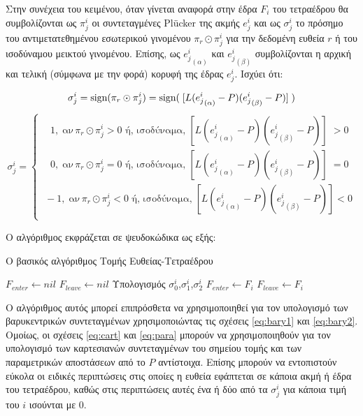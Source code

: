 Στην συνέχεια του κειμένου, όταν γίνεται αναφορά στην έδρα $F_i$ του τετραέδρου θα συμβολίζονται ως $\pi^i_j$ οι συντεταγμένες Plücker της ακμής $e^i_j$  και ως $\sigma^i_j$ το πρόσημο του αντιμετατεθημένου εσωτερικού γινομένου $\pi_r \odot \pi^i_j$ για την δεδομένη ευθεία $r$ ή του ισοδύναμου μεικτού γινομένου. Επίσης, ως ${e^i_j}_{(\alpha)}$ και ${e^i_j}_{(\beta)}$ συμβολίζονται η αρχική και τελική (σύμφωνα με την φορά) κορυφή της έδρας $e^i_j$. Ισχύει ότι:

\begin{equation}
\sigma^i_j =\text{sign}(\pi_r \odot \pi^i_j) = \text{sign}(\;[L({e^i_j}_{(\alpha)}-P)({e^i_j}_{(\beta)}-P)]\;)\\ 
\label{eq:sigmatostp} 
\end{equation}
\begin{equation}
\sigma^i_j =
\begin{cases}
 \;\; \;1,\;\text{αν}\,\pi_r \odot \pi^i_j>0\text{ ή, ισοδύναμα,} \;[L({e^i_j}_{(\alpha)}-P)({e^i_j}_{(\beta)}-P)]\;>0 \\
 \;\; \;0,\;\text{αν}\,\pi_r \odot \pi^i_j=0\text{ ή, ισοδύναμα,} \;[L({e^i_j}_{(\alpha)}-P)({e^i_j}_{(\beta)}-P)]\;=0 \\
 \; -1,\;\text{αν}\,\pi_r \odot \pi^i_j<0\text{ ή, ισοδύναμα,} \;[L ({e^i_j}_{(\alpha)}-P)({e^i_j}_{(\beta)}-P)]<0 \\
\end{cases}
\end{equation}

Ο αλγόριθμος εκφράζεται σε ψευδοκώδικα ως εξής:
\begin{algorithm}[H]
\caption{Ο βασικός αλγόριθμος Τομής Ευθείας-Τετραέδρου}
\label{segura0}
\begin{algorithmic}
\STATE $F_{enter} \gets nil$
\STATE $F_{leave} \gets nil$
\STATE Υπολογισμός $\sigma^i_0$,$ \sigma^i_1$,$\sigma^i_2$
\STATE$ F_{enter} \gets F_i$
\STATE$ F_{leave} \gets F_i$
\ENDIF
\ENDIF
\ENDFOR
\end{algorithmic}
\end{algorithm}

Ο αλγόριθμος αυτός μπορεί επιπρόσθετα να χρησιμοποιηθεί  για τον υπολογισμό των βαρυκεντρικών συντεταγμένων χρησιμοποιώντας τις σχέσεις \eqref{eq:bary1} και \eqref{eq:bary2}. Ομοίως, οι σχέσεις \eqref{eq:cart}
και \eqref{eq:para} μπορούν να χρησιμοποιηθούν για τον υπολογισμό των καρτεσιανών συντεταγμένων του σημείου τομής και των παραμετρικών αποστάσεων από το $P$ αντίστοιχα. Επίσης μπορούν να εντοπιστούν εύκολα οι ειδικές περιπτώσεις στις οποίες η ευθεία εφάπτεται σε κάποια ακμή ή έδρα του τετραέδρου, καθώς στις περιπτώσεις αυτές ένα ή δύο από τα $\sigma^i_j$ για κάποια τιμή του $i$ ισούνται με 0.

